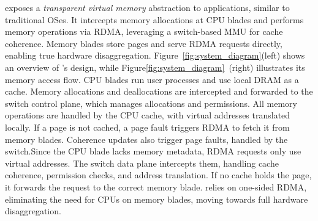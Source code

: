 \mind exposes a \textit{transparent virtual memory} abstraction to applications, similar to traditional OSes. It intercepts memory allocations at CPU blades and performs memory operations via RDMA, leveraging a switch-based MMU for cache coherence. Memory blades store pages and serve RDMA requests directly, enabling true hardware disaggregation. Figure~\ref{fig:system_diagram}(left) shows an overview of \mind's design, while Figure\ref{fig:system_diagram}~(right) illustrates its memory access flow. CPU blades run user processes and use local DRAM as a cache. Memory allocations and deallocations are intercepted and forwarded to the switch control plane, which manages allocations and permissions. All memory operations are handled by the CPU cache, with virtual addresses translated locally. If a page is not cached, a page fault triggers RDMA to fetch it from memory blades. Coherence updates also trigger page faults, handled by the switch.Since the CPU blade lacks memory metadata, RDMA requests only use virtual addresses. The switch data plane intercepts them, handling cache coherence, permission checks, and address translation. If no cache holds the page, it forwards the request to the correct memory blade. \mind relies on one-sided RDMA, eliminating the need for CPUs on memory blades, moving towards full hardware disaggregation.

